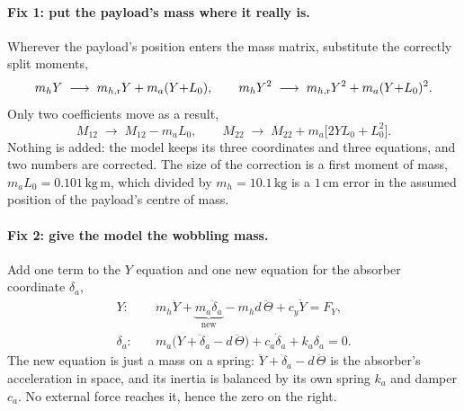 \paragraph{Fix 1: put the payload's mass where it really is.} Wherever the payload's position
enters the mass matrix, substitute the correctly split moments,
%
\begin{equation}
  m_h Y \;\longrightarrow\; m_{h,\mathrm{r}} Y + m_a(Y{+}L_0) ,
  \qquad
  m_h Y^2 \;\longrightarrow\; m_{h,\mathrm{r}} Y^2 + m_a(Y{+}L_0)^2 .
  \label{eq:fix1-substitution}
\end{equation}
%
Only two coefficients move as a result,
%
\begin{equation}
  M_{12} \;\longrightarrow\; M_{12} - m_a L_0 ,
  \qquad
  M_{22} \;\longrightarrow\; M_{22} + m_a\bigl[2YL_0 + L_0^2\bigr] .
  \label{eq:fix1}
\end{equation}
%
Nothing is added: the model keeps its three coordinates and three equations, and two numbers are
corrected. The size of the correction is a first moment of mass,
$m_a L_0 = 0.101\,\mathrm{kg\,m}$, which divided by $m_h = 10.1\,\mathrm{kg}$ is a
$1\,\mathrm{cm}$ error in the assumed position of the payload's centre of mass.

\paragraph{Fix 2: give the model the wobbling mass.} Add one term to the $Y$ equation and one
new equation for the absorber coordinate $\delta_a$,
%
\begin{align}
  Y:\quad & m_h \ddot Y + \underbrace{m_a \ddot\delta_a}_{\text{new}}
            - m_h d\,\ddot\Theta + c_y \dot Y = F_Y , \label{eq:fix2-y}\\[1mm]
  \delta_a:\quad & m_a\bigl(\ddot Y + \ddot\delta_a - d\,\ddot\Theta\bigr)
            + c_a \dot\delta_a + k_a \delta_a = 0 . \label{eq:fix2-absorber}
\end{align}
%
The new equation is just a mass on a spring: $\ddot Y + \ddot\delta_a - d\,\ddot\Theta$ is the
absorber's acceleration in space, and its inertia is balanced by its own spring $k_a$ and damper
$c_a$. No external force reaches it, hence the zero on the right.

